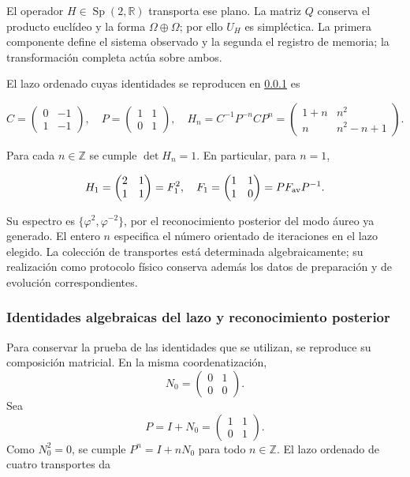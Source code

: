 El operador \(H\in\operatorname{Sp}(2,\mathbb R)\) transporta ese plano. La matriz \(Q\) conserva el producto euclídeo y la forma \(\Omega\oplus\Omega\); por ello \(U_H\) es simpléctica. La primera componente define el sistema observado y la segunda el registro de memoria; la transformación completa actúa sobre ambos.

El lazo ordenado cuyas identidades se reproducen en
\ref{md:antmem:lazo-ep} es

\begin{equation}
C=\begin{pmatrix}0&-1\\1&-1\end{pmatrix},\quad
P=\begin{pmatrix}1&1\\0&1\end{pmatrix},\quad
H_n=C^{-1}P^{-n}CP^n
=\begin{pmatrix}1+n&n^2\\n&n^2-n+1\end{pmatrix}.
\label{md:antmem:cuantica:eq:5.2}
\end{equation}

Para cada \(n\in\mathbb Z\) se cumple \(\det H_n=1\). En particular, para \(n=1\),

\begin{equation}
H_1=\begin{pmatrix}2&1\\1&1\end{pmatrix}
=F_1^2,\quad F_1=\begin{pmatrix}1&1\\1&0\end{pmatrix}
=P F_{\rm av}P^{-1}.
\label{md:antmem:cuantica:eq:5.3}
\end{equation}

Su espectro es \(\{\varphi^2,\varphi^{-2}\}\), por el reconocimiento posterior del modo áureo ya generado. El entero \(n\) especifica el número orientado de iteraciones en el lazo elegido. La colección de transportes está determinada algebraicamente; su realización como protocolo físico conserva además los datos de preparación y de evolución correspondientes.

\subsubsection{Identidades algebraicas del lazo y reconocimiento posterior}
\label{md:antmem:lazo-ep}
Para conservar la prueba de las identidades que se utilizan, se reproduce
su composición matricial. En la misma coordenatización,
\[
 N_0=\begin{pmatrix}0&1\\0&0\end{pmatrix}.
\]
Sea
\[
 P=I+N_0=\begin{pmatrix}1&1\\0&1\end{pmatrix}.
\]
Como \(N_0^2=0\), se cumple \(P^n=I+nN_0\) para todo
\(n\in\mathbb Z\).
El lazo ordenado de cuatro transportes da

